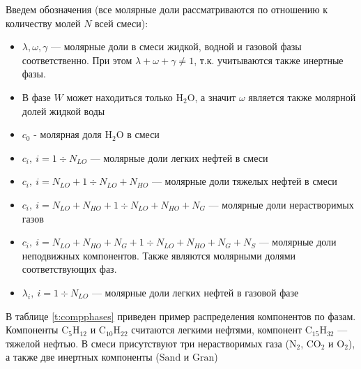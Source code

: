 \documentclass[12pt]{article}
\let\dividesymbol\div
\renewcommand{\div}{\operatorname{div}}
\begin{document}
Введем обозначения (все молярные доли рассматриваются по отношению к количеству молей $N$ всей смеси):
\begin{itemize}
\item $\lambda, \omega, \gamma$ --- молярные доли в смеси жидкой, водной и газовой фазы соответственно. При этом $\lambda + \omega + \gamma \ne 1$, т.к. учитываются также инертные фазы.
\item В фазе $W$ может находиться только $\mathrm{H_2O}$, а значит $\omega$ является также молярной долей жидкой воды
\item $c_0$ - молярная доля $\mathrm{H_2O}$ в смеси
\item $c_i, \: i = 1 \dividesymbol N_{LO}$ --- молярные доли легких нефтей в смеси
\item $c_i, \: i = N_{LO} + 1 \dividesymbol N_{LO} + N_{HO}$ --- молярные доли тяжелых нефтей в смеси
\item $c_i, \: i = N_{LO} + N_{HO} + 1 \dividesymbol N_{LO} + N_{HO} + N_G$ --- молярные доли нерастворимых газов
\item $c_i, \: i = N_{LO} + N_{HO} + N_G + 1 \dividesymbol N_{LO} + N_{HO} + N_G + N_S$ --- молярные доли неподвижных компонентов. Также являются молярными долями соответствующих фаз. 
\item $\lambda_i, \: i = 1 \dividesymbol N_{LO}$ --- молярные доли легких нефтей в газовой фазе

\end{itemize}

В таблице \ref{t:compphases} приведен пример распределения компонентов по фазам. Компоненты $\mathrm{C_5H_{12}}$ и $\mathrm{C_{10}H_{22}}$ считаются легкими нефтями, компонент $\mathrm{C_{15}H_{32}}$ --- тяжелой нефтью. В смеси присутствуют три нерастворимых газа ($\mathrm{N_2}$, $\mathrm{CO_2}$ и $\mathrm{O_2}$), а также две инертных компоненты ($\mathrm{Sand}$ и $\mathrm{Gran}$)
\end{document}
